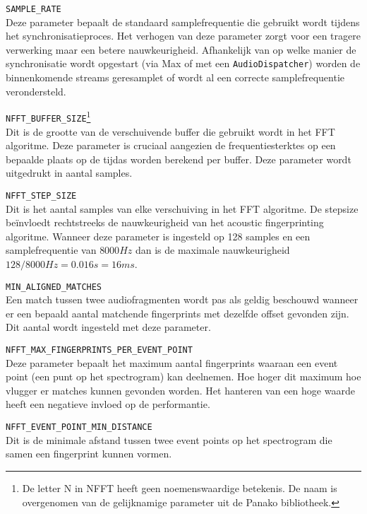 \begin{description}
\item\texttt{SAMPLE\_RATE} \hfill \\
Deze parameter bepaalt de standaard samplefrequentie die gebruikt wordt tijdens het synchronisatieproces. Het verhogen van deze parameter zorgt voor een tragere verwerking maar een betere nauwkeurigheid. Afhankelijk van op welke manier de synchronisatie wordt opgestart (via Max of met een \texttt{AudioDispatcher}) worden de binnenkomende streams geresamplet of wordt al een correcte samplefrequentie verondersteld.

\item\texttt{NFFT\_BUFFER\_SIZE}\footnote{De letter N in NFFT heeft geen noemenswaardige betekenis. De naam is overgenomen van de gelijknamige parameter uit de Panako bibliotheek.} \hfill \\
Dit is de grootte van de verschuivende buffer die gebruikt wordt in het FFT algoritme. Deze parameter is cruciaal aangezien de frequentiesterktes op een bepaalde plaats op de tijd\-as worden berekend per buffer. Deze parameter wordt uitgedrukt in aantal samples. \\
\item\texttt{NFFT\_STEP\_SIZE} \hfill \\
Dit is het aantal samples van elke verschuiving in het FFT algoritme. De stepsize beïnvloedt rechtstreeks de nauwkeurigheid van het acoustic fingerprinting algoritme. Wanneer deze parameter is ingesteld op 128 samples en een samplefrequentie van $8000Hz$ dan is de maximale nauwkeurigheid $128/8000Hz = 0.016s = 16ms$.
\item\texttt{MIN\_ALIGNED\_MATCHES} \hfill \\
Een match tussen twee audiofragmenten wordt pas als geldig beschouwd wanneer er een bepaald aantal matchende fingerprints met dezelfde offset gevonden zijn. Dit aantal wordt ingesteld met deze parameter.
\item\texttt{NFFT\_MAX\_FINGERPRINTS\_PER\_EVENT\_POINT} \hfill \\
Deze parameter bepaalt het maximum aantal fingerprints waaraan een event point (een punt op het spectrogram) kan deelnemen. Hoe hoger dit maximum hoe vlugger er matches kunnen gevonden worden. Het hanteren van een hoge waarde heeft een negatieve invloed op de performantie.
\item\texttt{NFFT\_EVENT\_POINT\_MIN\_DISTANCE} \hfill \\
Dit is de minimale afstand tussen twee event points op het spectrogram die samen een fingerprint kunnen vormen. 

\end{description}

